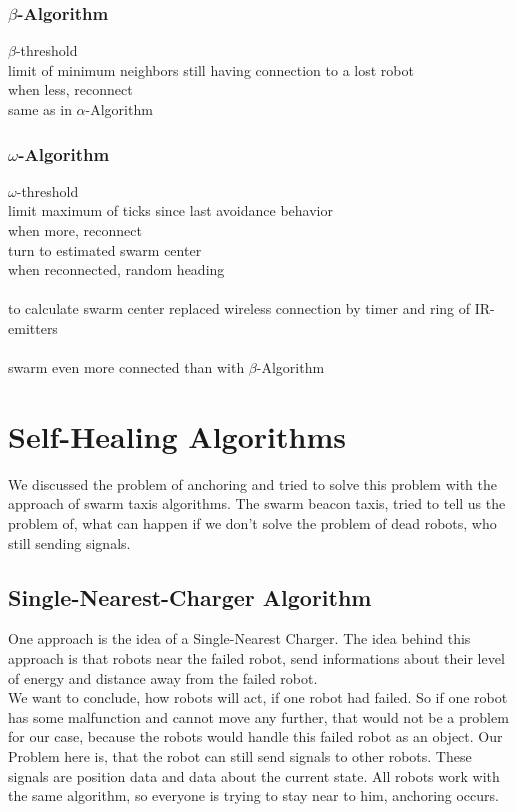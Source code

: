 \documentclass[
	a4paper,
	article,
	pagesize,
	pdftex,
	12pt,
	english,
	fleqn,
	final,
	]{scrartcl}
\begin{document}
\subsubsection{$\beta$-Algorithm}
$\beta$-threshold\\
limit of minimum neighbors still having connection to a lost robot\\
when less, reconnect\\
same as in $\alpha$-Algorithm

\subsubsection{$\omega$-Algorithm}
$\omega$-threshold\\
limit maximum of ticks since last avoidance behavior\\
when more, reconnect\\
turn to estimated swarm center\\
when reconnected, random heading\\
\ \\
to calculate swarm center replaced wireless connection by timer and ring of IR-emitters\\
\ \\
swarm even more connected than with $\beta$-Algorithm
\color{black}

\section{Self-Healing Algorithms}
We discussed the problem of anchoring and tried to solve this problem with the approach of swarm taxis algorithms. The swarm beacon taxis, tried to tell us the problem of, what can happen if we don't solve the problem of dead robots, who still sending signals.

\subsection{Single-Nearest-Charger Algorithm}
One approach is the idea of a Single-Nearest Charger.
The idea behind this approach is that robots near the failed robot, send informations about their level of energy and distance away from the failed robot.\\
We want to conclude, how robots will act, if one robot had failed. So if one robot has some malfunction and cannot move any further, that would not be a problem for our case, because the robots would handle this failed robot as an object. Our Problem here is, that the robot can still send signals to other robots. These signals are position data and data about the current state. All robots work with the same algorithm, so everyone is trying to stay near to him, anchoring occurs. \\
\end{document}
